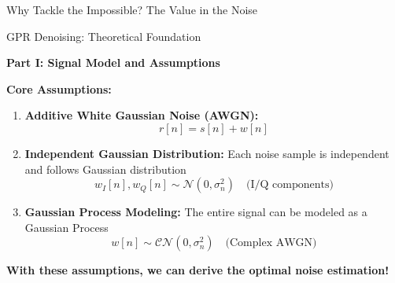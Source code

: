 \documentclass[aspectratio=169]{beamer}
\begin{document}
\begin{frame}{Why Tackle the Impossible? The Value in the Noise}
\vspace{0.2cm}
\begin{center}
\end{center}
\end{frame}

\begin{frame}{GPR Denoising: Theoretical Foundation}
\begin{center}
\textcolor{zjutblue}{\Large \textbf{Part I: Signal Model and Assumptions}}
\end{center}

\vspace{0.5cm}
\textbf{Core Assumptions:}
\begin{enumerate}
\item \textbf{Additive White Gaussian Noise (AWGN):}
   \begin{equation}
   r[n] = s[n] + w[n]
   \end{equation}

\item \textbf{Independent Gaussian Distribution:} Each noise sample is independent and follows Gaussian distribution
   \begin{equation}
   w_I[n], w_Q[n] \sim \mathcal{N}(0, \sigma_n^2) \quad \text{(I/Q components)}
   \end{equation}

\item \textbf{Gaussian Process Modeling:} The entire signal can be modeled as a Gaussian Process
   \begin{equation}
   w[n] \sim \mathcal{CN}(0, \sigma_n^2) \quad \text{(Complex AWGN)}
   \end{equation}
\end{enumerate}

\vspace{0.3cm}
\begin{center}
\textcolor{zjutgreen}{\textbf{With these assumptions, we can derive the optimal noise estimation!}}
\end{center}
\end{frame}
\end{document}
